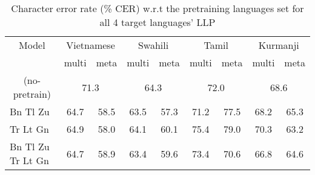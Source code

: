 \begin{table*}[ht!]
\centering
\caption{Character error rate (\si{\percent} CER) w.r.t the pretraining languages set for all 4 target languages' LLP}
\label{tab:llp-table}
\begin{tabular}{@{}ccccccccc@{}}
\toprule
Model                                    & \multicolumn{2}{c}{Vietnamese}                         & \multicolumn{2}{c}{Swahili}                        & \multicolumn{2}{c}{Tamil}                        & \multicolumn{2}{c}{Kurmanji} \\

                                         & multi           & meta                                & multi           & meta                                & multi           & meta                                & multi           & meta           \\ \midrule
\multicolumn{1}{c|}{(no-pretrain)}                   & \multicolumn{2}{c|}{71.3}                    & \multicolumn{2}{c|}{64.3}                    & \multicolumn{2}{c|}{72.0}          & \multicolumn{2}{c}{68.6}                    \\

\multicolumn{1}{l|}{Bn Tl Zu}   & 64.7          & \multicolumn{1}{c|}{58.5}          & 63.5          & \multicolumn{1}{c|}{57.3}          & 71.2          & \multicolumn{1}{c|}{77.5}          & 68.2         & 65.3          \\
\multicolumn{1}{l|}{ \qquad \qquad Tr Lt Gn} & 64.9          & \multicolumn{1}{c|}{58.0}          & 64.1          & \multicolumn{1}{c|}{60.1}          & 75.4          & \multicolumn{1}{c|}{79.0}          & 70.3          & 63.2          \\
\multicolumn{1}{l|}{Bn Tl Zu Tr Lt Gn}           & 64.7          & \multicolumn{1}{c|}{58.9}          & 63.4          & \multicolumn{1}{c|}{59.6}          & 73.4          & \multicolumn{1}{c|}{70.6}          & 66.8          & 64.6          \\ \bottomrule
\end{tabular}
\end{table*}

